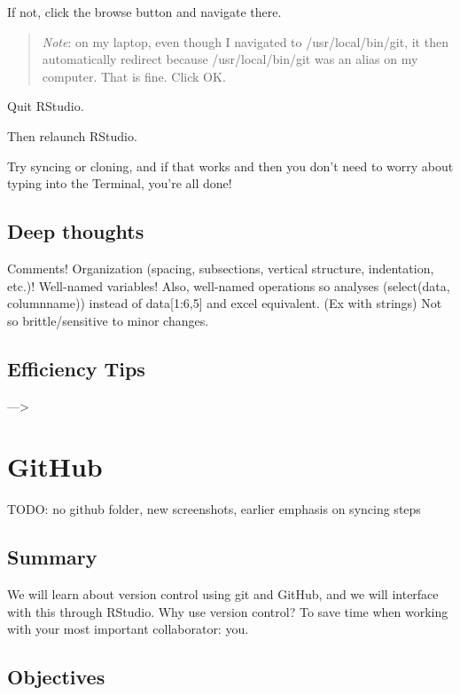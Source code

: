 \documentclass[]{book}
\begin{document}
If not, click the browse button and navigate there.

\begin{quote}
\emph{Note}: on my laptop, even though I navigated to /usr/local/bin/git, it then automatically redirect because /usr/local/bin/git was an alias on my computer. That is fine. Click OK.
\end{quote}

Quit RStudio.

Then relaunch RStudio.

Try syncing or cloning, and if that works and then you don't need to worry about typing into the Terminal, you're all done!

\hypertarget{deep-thoughts}{%
\section{Deep thoughts}\label{deep-thoughts}}

Comments! Organization (spacing, subsections, vertical structure, indentation, etc.)! Well-named variables! Also, well-named operations so analyses (select(data, columnname)) instead of data{[}1:6,5{]} and excel equivalent. (Ex with strings)
Not so brittle/sensitive to minor changes.

\hypertarget{efficiency-tips}{%
\section{Efficiency Tips}\label{efficiency-tips}}

---\textgreater{}

\hypertarget{github}{%
\chapter{GitHub}\label{github}}

TODO: no github folder, new screenshots, earlier emphasis on syncing steps

\hypertarget{summary-1}{%
\section{Summary}\label{summary-1}}

We will learn about version control using git and GitHub, and we will interface with this through RStudio. Why use version control? To save time when working with your most important collaborator: you.

\hypertarget{objectives-1}{%
\section{Objectives}\label{objectives-1}}
\end{document}
